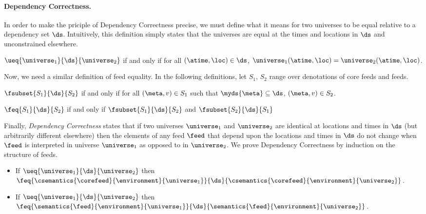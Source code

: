 \paragraph*{Dependency Correctness.}  
In order to make the priciple of Dependency Correctness
precise, we must define what it means for two universes
to be equal relative to a dependency set $\ds$.  Intuitively,
this definition simply states that the universes are equal at the
times and locations in $\ds$ and unconstrained elsewhere.

\begin{definition}
$\ueq{\universe_1}{\ds}{\universe_2}$ if and only if for all
$(\atime,\loc) \in \ds$, $\universe_1(\atime,\loc) = \universe_2(\atime,\loc)$.
\end{definition}

\noindent
Now, we need a similar definition of feed equality.  In the following
definitions, let $S_1$, $S_2$ range over denotations of core feeds and feeds.

\begin{definition}
$\fsubset{S_1}{\ds}{S_2}$ if and only if for all
$(\meta,v) \in S_1$ such that
$\myds{\meta} \subseteq \ds$, $(\meta,v) \in S_2$.
\end{definition}

\begin{definition}
$\feq{S_1}{\ds}{S_2}$ if and only if 
$\fsubset{S_1}{\ds}{S_2}$ and
$\fsubset{S_2}{\ds}{S_1}$
\end{definition}

\noindent
Finally, {\em Dependency Correctness} states that if two universes
$\universe_1$ and $\universe_2$ are identical at locations and times in $\ds$
(but arbitrarily different elsewhere) then the elements of any feed $\feed$
that depend upon the locations and times in $\ds$ do not change when
$\feed$ is interpreted in universe $\universe_1$ 
as opposed to in $\universe_2$.  We prove Dependency Correctness
by induction on the structure of feeds.  

\begin{theorem}
\begin{itemize}
\item
If $\ueq{\universe_1}{\ds}{\universe_2}$ then
$\feq{\csemantics{\corefeed}{\environment}{\universe_1}}{\ds}{\csemantics{\corefeed}{\environment}{\universe_2}}$.
\item 
If $\ueq{\universe_1}{\ds}{\universe_2}$ then
$\feq{\semantics{\feed}{\environment}{\universe_1}}{\ds}{\semantics{\feed}{\environment}{\universe_2}}$.
\end{itemize}
\end{theorem}






